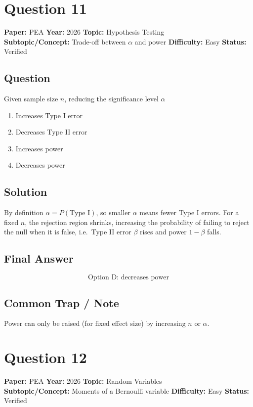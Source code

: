 \documentclass[11pt]{article}
\begin{document}
\section*{Question 11}
\textbf{Paper:} PEA \quad \textbf{Year:} 2026 \quad \textbf{Topic:} Hypothesis Testing \\
\textbf{Subtopic/Concept:} Trade-off between $\alpha$ and power \quad
\textbf{Difficulty:} Easy \quad \textbf{Status:} Verified

\subsection*{Question}
Given sample size $n$, reducing the significance level $\alpha$
\begin{enumerate}[label=(\Alph*)]
\item Increases Type I error
\item Decreases Type II error
\item Increases power
\item Decreases power
\end{enumerate}

\subsection*{Solution}
By definition $\alpha = P(\text{Type I})$, so smaller $\alpha$ means fewer Type I
errors. For a fixed $n$, the rejection region shrinks, increasing the probability
of failing to reject the null when it is false, i.e.\ Type II error $\beta$ rises
and power $1-\beta$ falls.

\subsection*{Final Answer}
\[
\boxed{\text{Option D: decreases power}}
\]

\subsection*{Common Trap / Note}
Power can only be raised (for fixed effect size) by increasing $n$ or $\alpha$.

\section*{Question 12}
\textbf{Paper:} PEA \quad \textbf{Year:} 2026 \quad \textbf{Topic:} Random Variables \\
\textbf{Subtopic/Concept:} Moments of a Bernoulli variable \quad
\textbf{Difficulty:} Easy \quad \textbf{Status:} Verified
\end{document}
